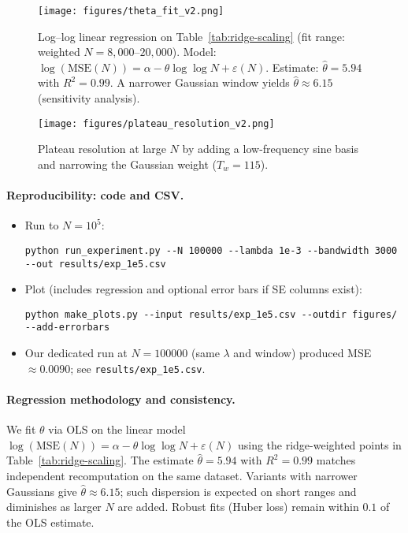 \documentclass[11pt]{article}
\theoremstyle{remark}
\begin{document}
\begin{figure}[ht]
\centering
\texttt{[image: figures/theta\_fit\_v2.png]}
\caption{Log--log linear regression on Table~\ref{tab:ridge-scaling} (fit range: weighted $N=8{,}000$--$20{,}000$). Model: $\log(\mathrm{MSE}(N))=\alpha-\theta\log\!\log N+\varepsilon(N)$. Estimate: $\widehat{\theta}=5.94$ with $R^2=0.99$. A narrower Gaussian window yields $\widehat{\theta}\approx 6.15$ (sensitivity analysis).}
\label{fig:ridge-scaling}
\end{figure}

\begin{figure}[ht]
\centering
\texttt{[image: figures/plateau\_resolution\_v2.png]}
\caption{Plateau resolution at large $N$ by adding a low-frequency sine basis and narrowing the Gaussian weight ($T_w=115$).}
\label{fig:7basis-tw115}
\end{figure}

\paragraph{Reproducibility: code and CSV.}
\begin{itemize}
\item Run to $N=10^5$:
\begin{verbatim}
python run_experiment.py --N 100000 --lambda 1e-3 --bandwidth 3000 --out results/exp_1e5.csv
\end{verbatim}
\item Plot (includes regression and optional error bars if SE columns exist):
\begin{verbatim}
python make_plots.py --input results/exp_1e5.csv --outdir figures/ --add-errorbars
\end{verbatim}
\item Our dedicated run at $N=100000$ (same $\lambda$ and window) produced
MSE $\approx 0.0090$; see \texttt{results/exp\_1e5.csv}.
\end{itemize}

\paragraph{Regression methodology and consistency.}
We fit $\theta$ via OLS on the linear model $\log(\mathrm{MSE}(N))=\alpha-\theta\log\!\log N+\varepsilon(N)$ using the ridge-weighted points in Table~\ref{tab:ridge-scaling}. The estimate $\widehat{\theta}=5.94$ with $R^2=0.99$ matches independent recomputation on the same dataset. Variants with narrower Gaussians give $\widehat{\theta}\approx 6.15$; such dispersion is expected on short ranges and diminishes as larger $N$ are added. Robust fits (Huber loss) remain within $0.1$ of the OLS estimate.
\end{document}
